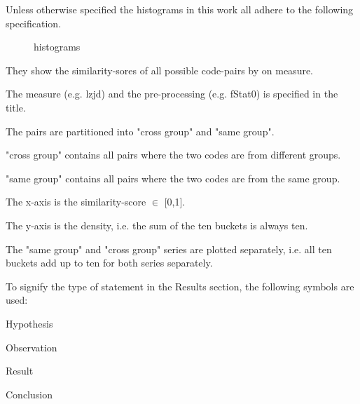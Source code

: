 \documentclass[../main.tex]{subfiles}
\begin{document}
Unless otherwise specified the histograms  in this work all adhere to the following specification.

\begin{figure}[ht!]
  \centering

  \caption{histograms}
  \label{fig:histograms}
\end{figure}

\begin{ul}
  \item They show the similarity-sores of all possible code-pairs by on measure.
  \item The measure (e.g. lzjd) and the pre-processing (e.g. fStat0) is specified in the title.
  \item The pairs are partitioned into "cross group" and "same group".
  \item "cross group" contains all pairs where the two codes are from different groups.
  \item "same group" contains all pairs where the two codes are from the same group.
  \item The x-axis is the similarity-score $\in$ [0,1].
  \item The y-axis is the density, i.e. the sum of the ten buckets is always ten.
  \item The "same group" and "cross group" series are plotted separately, i.e. all ten buckets add up to ten for both series separately.
\end{ul}


To signify the type of statement in the Results section, the following symbols are used:

\begin{hyp}Hypothesis\end{hyp}
\begin{obs}Observation\end{obs}
\begin{res}Result\end{res}
\begin{conc}Conclusion\end{conc}
\end{document}
